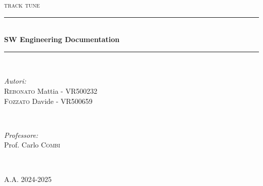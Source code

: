 \begin{titlepage}
    $ $
    \vspace{5pt}
    \newcommand{\HRule}{\rule{\linewidth}{0.5mm}}
    \begin{center}
    \textsc{\normalsize track tune}\\[1cm]
    \end{center}
    
    \center
     
    
    \HRule \\[0.4cm]
    { \huge \bfseries SW Engineering Documentation}\\[0.4cm] %
    \HRule \\[1.5cm]
     
    
    \begin{minipage}{0.4\textwidth}
    \begin{flushleft} \large
    \emph{Autori:}\\
    \textsc{Rebonato} Mattia - VR500232\\
    \textsc{Fozzato} Davide - VR500659\\
    \end{flushleft}
    \end{minipage}
    ~
    \begin{minipage}{0.4\textwidth}
    \begin{flushright} \large
    \emph{Professore:} \\
    Prof. Carlo \textsc{Combi}
    \end{flushright}
    \end{minipage}\\[2cm]
    
    \vspace{250pt}
    
    \textsc{\normalsize A.A. 2024-2025}\\[0.5cm]
    
    \vfill %
    \end{titlepage}